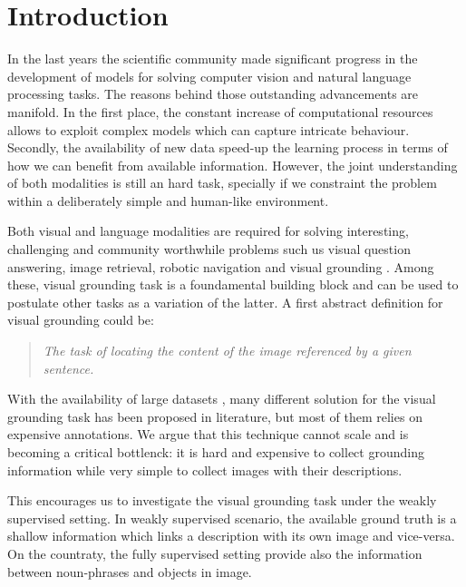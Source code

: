 \chapter{Introduction}
\label{introduction}

In the last years the scientific community made significant progress
in the development of models for solving computer vision and natural
language processing tasks. The reasons behind those outstanding
advancements are manifold. In the first place, the constant increase
of computational resources allows to exploit complex models which can
capture intricate behaviour. Secondly, the availability of new data
speed-up the learning process in terms of how we can benefit from
available information. However, the joint understanding of both
modalities is still an hard task, specially if we constraint the
problem within a deliberately simple and human-like environment.

Both visual and language modalities are required for solving
interesting, challenging and community worthwhile problems such us
visual question answering, image retrieval, robotic navigation and
visual grounding . Among these, visual grounding
task is a foundamental building block and can be used to postulate
other tasks as a variation of the latter. A first abstract definition
for visual grounding could be:

\begin{quote}
    \textit{The task of locating the content of the image referenced
    by a given sentence.}
\end{quote}

With the availability of large datasets ,
many different solution for the visual grounding task has been
proposed in literature, but most of them relies on expensive
annotations. We argue that this technique cannot scale and is becoming
a critical bottlenck: it is hard and expensive to collect grounding
information while very simple to collect images with their
descriptions.

This encourages us to investigate the visual grounding task under the
weakly supervised setting. In weakly supervised scenario, the
available ground truth is a shallow information which links a
description with its own image and vice-versa. On the countraty, the
fully supervised setting provide also the information between
noun-phrases and objects in image.
